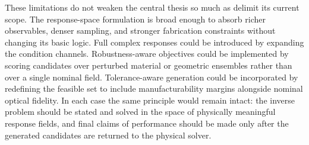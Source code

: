 These limitations do not weaken the central thesis so much as delimit its current scope. The response-space formulation is broad enough to absorb richer observables, denser sampling, and stronger fabrication constraints without changing its basic logic. Full complex responses could be introduced by expanding the condition channels. Robustness-aware objectives could be implemented by scoring candidates over perturbed material or geometric ensembles rather than over a single nominal field. Tolerance-aware generation could be incorporated by redefining the feasible set to include manufacturability margins alongside nominal optical fidelity. In each case the same principle would remain intact: the inverse problem should be stated and solved in the space of physically meaningful response fields, and final claims of performance should be made only after the generated candidates are returned to the physical solver.
